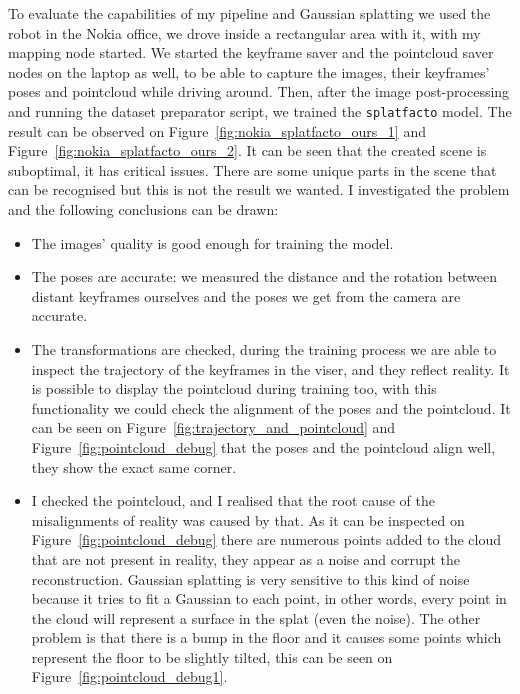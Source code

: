 

To evaluate the capabilities of my pipeline and Gaussian splatting we used the robot in the Nokia office, we drove inside a rectangular area with it, with my mapping node started. We started the keyframe saver and the pointcloud saver nodes on the laptop as well, to be able to capture the images, their keyframes' poses and pointcloud while driving around. Then, after the image post-processing and running the dataset preparator script, we trained the \verb|splatfacto| model. The result can be observed on Figure~\ref{fig:nokia_splatfacto_ours_1} and Figure~\ref{fig:nokia_splatfacto_ours_2}. It can be seen that the created scene is suboptimal, it has critical issues. There are some unique parts in the scene that can be recognised but this is not the result we wanted. I investigated the problem and the following conclusions can be drawn:
\begin{itemize}
    \item The images' quality is good enough for training the model.
    \item The poses are accurate: we measured the distance and the rotation between distant keyframes ourselves and the poses we get from the camera are accurate.
    \item The transformations are checked, during the training process we are able to inspect the trajectory of the keyframes in the viser, and they reflect reality. It is possible to display the pointcloud during training too, with this functionality we could check the alignment of the poses and the pointcloud. It can be seen on Figure~\ref{fig:trajectory_and_pointcloud} and Figure~\ref{fig:pointcloud_debug} that the poses and the pointcloud align well, they show the exact same corner.
    \item I checked the pointcloud, and I realised that the root cause of the misalignments of reality was caused by that. As it can be inspected on Figure~\ref{fig:pointcloud_debug} there are numerous points added to the cloud that are not present in reality, they appear as a noise and corrupt the reconstruction. Gaussian splatting is very sensitive to this kind of noise because it tries to fit a Gaussian to each point, in other words, every point in the cloud will represent a surface in the splat (even the noise). The other problem is that there is a bump in the floor and it causes some points which represent the floor to be slightly tilted, this can be seen on Figure~\ref{fig:pointcloud_debug1}.
\end{itemize}


